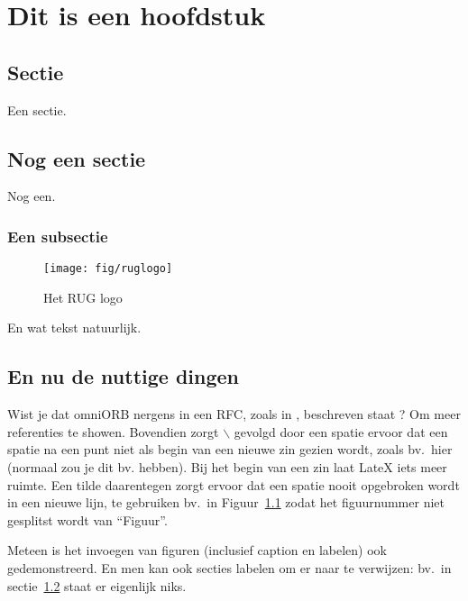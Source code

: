\chapter{Dit is een hoofdstuk}

\section{Sectie}

Een sectie.

\section{Nog een sectie}
\label{sec:nogeensectie}

Nog een.

\subsection{Een subsectie}

\begin{figure}[htb]
\begin{center}
 \texttt{[image: fig/ruglogo]}
 \caption{Het RUG logo}
 \label{fig:ruglogo}
\end{center}
\end{figure}

En wat tekst natuurlijk.

\section{En nu de nuttige dingen}

Wist je dat omniORB\cite{omniorb} nergens in een RFC, zoals in \cite{2-BIT}, beschreven staat ? Om meer referenties\cite{omniorb, 2-BIT} te showen. Bovendien zorgt $\backslash$ gevolgd door een spatie ervoor dat een spatie na
een punt niet als begin van een nieuwe zin gezien wordt, zoals bv.\ hier (normaal zou je dit bv. hebben). Bij het begin van een zin laat LateX iets meer ruimte. Een tilde daarentegen
zorgt ervoor dat een spatie nooit opgebroken wordt in een nieuwe lijn, te gebruiken bv.\ in Figuur~\ref{fig:ruglogo} zodat het figuurnummer niet
gesplitst wordt van ``Figuur''.

Meteen is het invoegen van figuren (inclusief caption en labelen) ook gedemonstreerd. En men kan ook secties labelen om er naar te verwijzen: bv.\ in
sectie~\ref{sec:nogeensectie} staat er eigenlijk niks.


